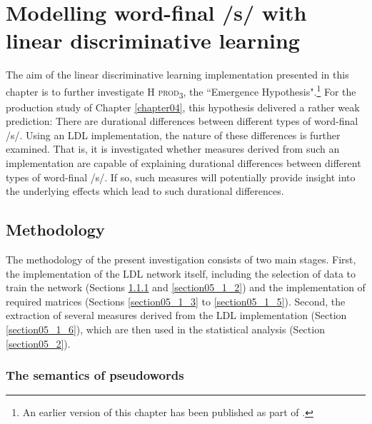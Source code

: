 \chapter{Modelling word-final /s/ with linear discriminative learning}\label{chapter05}

The aim of the linear discriminative learning implementation presented in this chapter is to further investigate \textsc{H prod\textsubscript{3}}, the ``Emergence Hypothesis".\footnote{An earlier version of this chapter has been published as part of \cite{Schmitz2021b}.} For the production study of Chapter \ref{chapter04}, this hypothesis delivered a rather weak prediction: There are durational differences between different types of word-final /s/. Using an LDL implementation, the nature of these differences is further examined. That is, it is investigated whether measures derived from such an implementation are capable of explaining durational differences between different types of word-final /s/. If so, such measures will potentially provide insight into the underlying effects which lead to such durational differences.

\section{Methodology}\label{section05_1}

The methodology of the present investigation consists of two main stages. First, the implementation of the LDL network itself, including the selection of data to train the network (Sections \ref{section05_1_1} and \ref{section05_1_2}) and the implementation of required matrices (Sections \ref{section05_1_3} to \ref{section05_1_5}). Second, the extraction of several measures derived from the LDL implementation (Section \ref{section05_1_6}), which are then used in the statistical analysis (Section \ref{section05_2}).

\subsection{The semantics of pseudowords}\label{section05_1_1}

